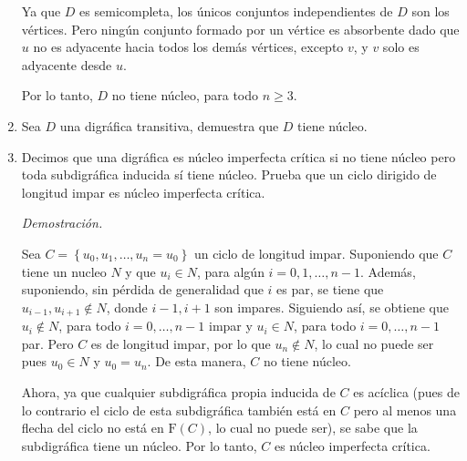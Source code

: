 \documentclass[12pt, fleqn]{article}
\newcommand{\F}[1]{\mathrm{F} \! \left( #1 \right)}
\begin{document}
\begin{enumerate}
		Ya que $D$ es semicompleta, los únicos conjuntos independientes de $D$ son los vértices. Pero ningún conjunto formado por un vértice es absorbente dado que $ u $ no es adyacente hacia todos los demás vértices, excepto $v$, y $ v $ solo es adyacente desde $u$.

		Por lo tanto, $D$ no tiene núcleo, para todo $ n \geq 3 $.
		
		\vspace{3mm}
		
		\item Sea $D$ una digráfica transitiva, demuestra que $D$ tiene núcleo.
		
		\item Decimos que una digráfica es núcleo imperfecta crítica si no tiene núcleo pero toda subdigráfica inducida sí tiene núcleo. Prueba que un ciclo dirigido de longitud impar es núcleo imperfecta crítica.
		
		\emph{Demostración.}

		Sea $ C = \left\lbrace u_0, u_1, \ldots, u_n = u_0 \right\rbrace $ un ciclo de longitud impar. Suponiendo que $ C $ tiene un nucleo $ N $ y que $ u_i \in N $, para algún $ i = 0, 1, \ldots, n-1 $. Además, suponiendo, sin pérdida de generalidad que $ i $ es par, se tiene que $ u_{i-1}, u_{i+1} \notin N $, donde $ i-1, i+1 $ son impares. Siguiendo así, se obtiene que $ u_i \notin N $, para todo $ i = 0, \ldots, n-1 $ impar y $ u_i \in N $, para todo $ i = 0, \ldots, n-1 $ par. Pero $C$ es de longitud impar, por lo que $ u_n \notin N $, lo cual no puede ser pues $ u_0 \in N $ y $ u_0 = u_n $. De esta manera, $ C $ no tiene núcleo.

		Ahora, ya que cualquier subdigráfica propia inducida de $ C $ es acíclica (pues de lo contrario el ciclo de esta subdigráfica
		también está en $C$ pero al menos una flecha del ciclo no está en $ \F{C} $, lo cual no puede ser), se sabe que la subdigráfica tiene un núcleo. Por lo tanto, $C$ es núcleo imperfecta crítica.
		
	\end{enumerate}
\end{document}
